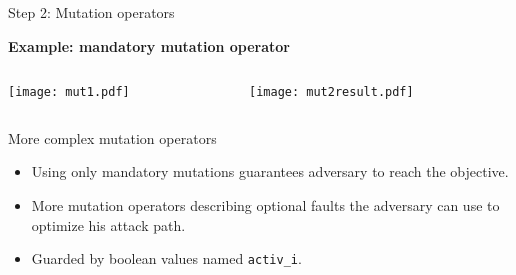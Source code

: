 \begin{frame}[fragile]{Step 2: Mutation operators}
\vfill
\begin{center}
{\bf\large Example: mandatory mutation operator}
\end{center}
\vspace{-1em}
\begin{columns}[t]
\begin{column}{0.45\textwidth}
\texttt{[image: mut1.pdf]} 
\end{column}
\begin{column}{0.45\textwidth}
\texttt{[image: mut2result.pdf]} 
\end{column}
\end{columns}
\vfill
\begin{block}{More complex mutation operators}
\begin{itemize}
	\item Using only mandatory mutations guarantees adversary to reach the objective.
	\item More mutation operators describing optional faults the adversary can use to optimize his attack path.
    \item Guarded by boolean values named {\tt activ\_i}.
\end{itemize}
\end{block}
\vfill
\end{frame}



